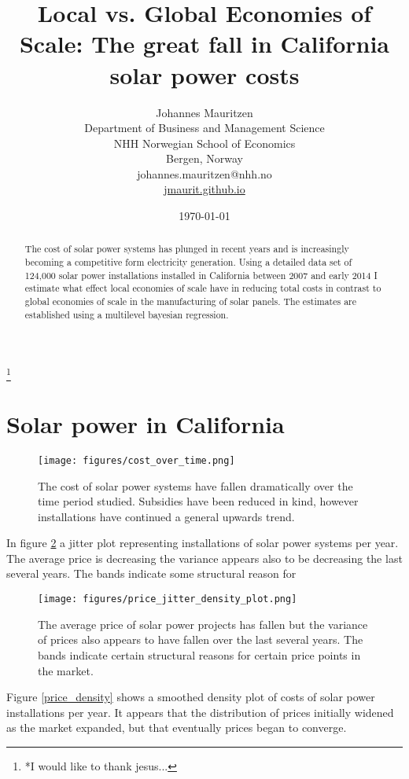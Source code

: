 \documentclass[12pt]{article}
\title{Local vs. Global Economies of Scale: The great fall in California solar power costs}
\author{Johannes Mauritzen\\
		Department of Business and Management Science\\
        NHH Norwegian School of Economics\\
        Bergen, Norway\\
        johannes.mauritzen@nhh.no\\
        \url{jmaurit.github.io}\\
		}
\date{\today}
\begin{document}
	\maketitle


\begin{abstract}
The cost of solar power systems has plunged in recent years and is increasingly becoming a competitive form electricity generation.  Using a detailed data set of 124,000 solar power installations installed in California between 2007 and early 2014 I estimate what effect local economies of scale have in reducing total costs in contrast to global economies of scale in the manufacturing of solar panels.  The estimates are established using a multilevel bayesian regression.  
\end{abstract}

\thanks{*I would like to thank jesus...}

\section{Solar power in California}

\begin{figure}
	\texttt{[image: figures/cost\_over\_time.png]}
	\caption{The cost of solar power systems have fallen dramatically over the time period studied.  Subsidies have been reduced in kind, however installations have continued a general upwards trend.}
	\label{cost_over_time}	
	\end{figure}

In figure \ref{price_jitter_density} a jitter plot representing installations of solar power systems per year. The average price is decreasing the variance appears also to be decreasing the last several years.  The bands indicate some structural reason for 

\begin{figure}
	\texttt{[image: figures/price\_jitter\_density\_plot.png]}
	\caption{The average price of solar power projects has fallen but the variance of prices also appears to have fallen over the last several years.  The bands indicate certain structural reasons for certain price points in the market.}
	\label{price_jitter_density}	
	\end{figure}

Figure \ref{price_density} shows a smoothed density plot of costs of solar power installations per year.  It appears that the distribution of prices initially widened as the market expanded, but that eventually prices began to converge.  
\end{document}
